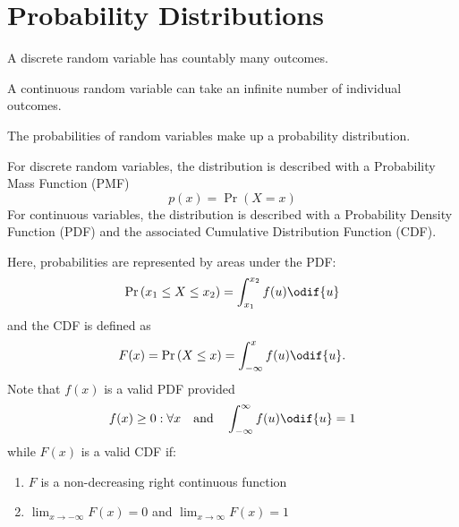 \documentclass{article}
\begin{document}
\section{Probability Distributions}
\begin{definition}
    A discrete random variable has countably many outcomes.
\end{definition}
\begin{definition}
    A continuous random variable can take an infinite number of individual outcomes.
\end{definition}
\begin{definition}
    The probabilities of random variables make up a probability distribution.

    For discrete random variables, the distribution is described with a Probability
    Mass Function (PMF)
    \begin{equation*}
        p(x) = \Pr{\left( X = x \right)}
    \end{equation*}
    For continuous variables, the distribution is described with a Probability
    Density Function (PDF) and the associated Cumulative Distribution Function (CDF).

    Here, probabilities are represented by areas under the PDF\@:
    \begin{equation*}
        \Pr{\left( x_1 \leq X \leq x_2 \right)} = \int_{x_1}^{x_2} f(u) \odif{u}
    \end{equation*}
    and the CDF is defined as
    \begin{equation*}
        F(x) = \Pr{\left( X \leq x \right)} = \int_{-\infty}^{x} f(u) \odif{u}.
    \end{equation*}
    Note that \(f(x)\) is a valid PDF provided
    \begin{equation*}
        f(x) \geq 0:\forall x \quad \text{and} \quad \int_{-\infty}^{\infty} f(u) \odif{u} = 1
    \end{equation*}
    while \(F(x)\) is a valid CDF if:
    \begin{enumerate}
        \item \(F\) is a non-decreasing right continuous function
        \item \(\lim_{x\to-\infty} F(x) = 0\) and \(\lim_{x\to\infty} F(x) = 1\)
    \end{enumerate}
\end{definition}
\end{document}
